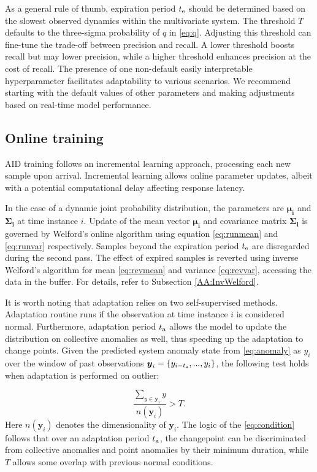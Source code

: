 As a general rule of thumb, expiration period $t _{\text{e}}$ should be determined based on the slowest observed dynamics within the multivariate system. The threshold $T$ defaults to the three-sigma probability of $q$ in \eqref{eq:q}. Adjusting this threshold can fine-tune the trade-off between precision and recall. A lower threshold boosts recall but may lower precision, while a higher threshold enhances precision at the cost of recall. The presence of one non-default easily interpretable hyperparameter facilitates adaptability to various scenarios. We recommend starting with the default values of other parameters and making adjustments based on real-time model performance.

\subsection{Online training}\label{train}
AID training follows an incremental learning approach, processing each new sample upon arrival. Incremental learning allows online parameter updates, albeit with a potential computational delay affecting response latency.

In the case of a dynamic joint probability distribution, the parameters are $\boldsymbol{\mu_i}$ and $\boldsymbol{\Sigma_i}$ at time instance \(i\). Update of the mean vector $\boldsymbol{\mu_i}$ and covariance matrix $\boldsymbol{\Sigma_i}$ is governed by Welford's online algorithm using equation \eqref{eq:runmean} and \eqref{eq:runvar} respectively. Samples beyond the expiration period $t _{\text{e}}$ are disregarded during the second pass. The effect of expired samples is reverted using inverse Welford's algorithm for mean \eqref{eq:revmean} and variance \eqref{eq:revvar}, accessing the data in the buffer. For details, refer to Subsection \ref{AA:InvWelford}.

It is worth noting that adaptation relies on two self-supervised methods. Adaptation routine runs if the observation at time instance \(i\) is considered normal. Furthermore, adaptation period $t _{\text{a}}$ allows the model to update the distribution on collective anomalies as well, thus speeding up the adaptation to change points. Given the predicted system anomaly state from \eqref{eq:anomaly} as $y_i$ over the window of past observations \(\boldsymbol{y}_i=\{y_{i-t _{\text{a}}},...,y_{i}\}\), the following test holds when adaptation is performed on outlier:

\begin{equation}
  {\frac{\sum_{y\in \boldsymbol{y}_i}y}{n(\boldsymbol{y}_i)}} > T\text{.}\label{eq:condition}
\end{equation}
Here \(n(\boldsymbol{y}_i)\) denotes the dimensionality of \(\boldsymbol{y}_i\). The logic of the \eqref{eq:condition} follows that over an adaptation period $t _{\text{a}}$, the changepoint can be discriminated from collective anomalies and point anomalies by their minimum duration, while $T$ allows some overlap with previous normal conditions.

